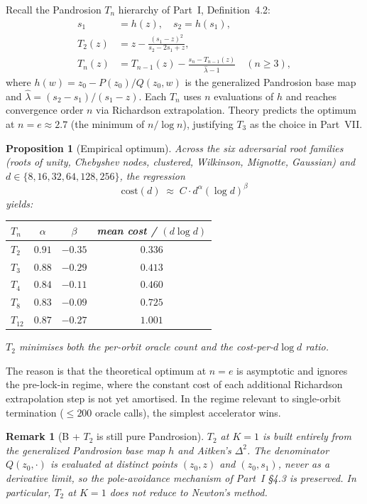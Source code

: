 \documentclass[11pt,a4paper]{article}
\newtheorem{remark}[theorem]{Remark}
\newtheorem{proposition}[theorem]{Proposition}
\begin{document}
Recall the Pandrosion $T_n$ hierarchy of Part~I, Definition~4.2:
\begin{align*}
s_1 &= h(z), \quad s_2 = h(s_1), \\
T_2(z) &= z - \frac{(s_1 - z)^2}{s_2 - 2 s_1 + z}, \\
T_n(z) &= T_{n-1}(z) - \frac{s_n - T_{n-1}(z)}{\hat\lambda - 1} \quad (n \ge 3),
\end{align*}
where $h(w) = z_0 - P(z_0)/Q(z_0, w)$ is the generalized Pandrosion base map and $\hat\lambda = (s_2 - s_1)/(s_1 - z)$. Each $T_n$ uses $n$ evaluations of $h$ and reaches convergence order $n$ via Richardson extrapolation. Theory predicts the optimum at $n = e \approx 2.7$ (the minimum of $n / \log n$), justifying $T_3$ as the choice in Part~VII.

\begin{proposition}[Empirical optimum]\label{prop:T2}
Across the six adversarial root families (roots of unity, Chebyshev nodes, clustered, Wilkinson, Mignotte, Gaussian) and $d \in \{8, 16, 32, 64, 128, 256\}$, the regression
$$ \mathrm{cost}(d) \;\approx\; C \cdot d^{\alpha} (\log d)^{\beta} $$
yields:
\begin{center}
\begin{tabular}{lccc}
\toprule
$T_n$ & $\alpha$ & $\beta$ & mean cost / $(d \log d)$ \\
\midrule
$T_2$  & $0.91$  & $-0.35$ & $\mathbf{0.336}$ \\
$T_3$  & $0.88$  & $-0.29$ & $0.413$ \\
$T_4$  & $0.84$  & $-0.11$ & $0.460$ \\
$T_8$  & $0.83$  & $-0.09$ & $0.725$ \\
$T_{12}$ & $0.87$ & $-0.27$ & $1.001$ \\
\bottomrule
\end{tabular}
\end{center}
$T_2$ minimises both the per-orbit oracle count and the cost-per-$d \log d$ ratio.
\end{proposition}

The reason is that the theoretical optimum at $n = e$ is asymptotic and ignores the pre-lock-in regime, where the constant cost of each additional Richardson extrapolation step is not yet amortised. In the regime relevant to single-orbit termination ($\le 200$ oracle calls), the simplest accelerator wins.

\begin{remark}[B + $T_2$ is still pure Pandrosion]
$T_2$ at $K = 1$ is built entirely from the generalized Pandrosion base map $h$ and Aitken's $\Delta^2$. The denominator $Q(z_0, \cdot)$ is evaluated at distinct points $(z_0, z)$ and $(z_0, s_1)$, never as a derivative limit, so the pole-avoidance mechanism of Part~I \S4.3 is preserved. In particular, $T_2$ at $K = 1$ does \emph{not} reduce to Newton's method.
\end{remark}
\end{document}
